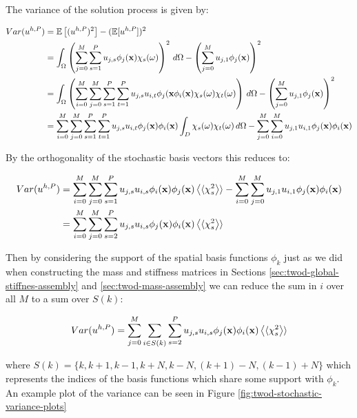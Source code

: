 The variance of the solution process is given by:

\begin{align}
  \begin{split}
      Var(u^{h,P}) &= \mathbb{E}\left[(u^{h,P})^2\right] - (\mathbb{E}[u^{h,P}])^2 \\
        &= \int_\Omega\left(
              \sum_{j=0}^M\sum_{s=1}^Pu_{j,s}\phi_j(\mathbf{x})\chi_s(\omega)
          \right)^2\, d\Omega - \left(\sum_{j=0}^Mu_{j,1}\phi_j(\mathbf{x})\right)^2 \\
          &= \int_\Omega\left(\sum_{i=0}^M\sum_{j=0}^M\sum_{s=1}^P\sum_{t=1}^P
          u_{j,s}u_{i,t}\phi_j(\mathbf{x}\phi_i(\mathbf{x})\chi_s(\omega)\chi_t(\omega)
      \right)\, d\Omega - \left(\sum_{j=0}^Mu_{j,1}\phi_j(\mathbf{x})\right)^2 \\
      &= \sum_{i=0}^M\sum_{j=0}^M\sum_{s=1}^P\sum_{t=1}^Pu_{j,s}u_{i,t}
         \phi_j(\mathbf{x})\phi_i(\mathbf{x})\int_D\chi_s(\omega)\chi_t(\omega)\, d\Omega
         - \sum_{j=0}^M\sum_{i=0}^Mu_{j,1}u_{i,1}\phi_j(\mathbf{x})\phi_i(\mathbf{x})
  \end{split}
\end{align}

By the orthogonality of the stochastic basis vectors this reduces to:

\begin{align}
  \begin{split}
    Var(u^{h,P}) &= \sum_{i=0}^M\sum_{j=0}^M\sum_{s=1}^P
        u_{j,s}u_{i,s}\phi_i(\mathbf{x})\phi_j(\mathbf{x})\left\langle\langle\chi_s^2\right\rangle\rangle -
        \sum_{i=0}^M\sum_{j=0}^Mu_{j,1}u_{i,1}\phi_j(\mathbf{x})\phi_i(\mathbf{x}) \\
      &= \sum_{i=0}^M\sum_{j=0}^M\sum_{s=2}^P
        u_{j,s}u_{i,s}\phi_j(\mathbf{x})\phi_i(\mathbf{x})\left\langle\langle\chi_s^2\right\rangle\rangle
  \end{split}
\end{align}

Then by considering the support of the spatial basis functions $\phi_k$ just as
we did when constructing the mass and stiffness matrices in Sections
\ref{sec:twod-global-stiffnes-assembly} and \ref{sec:twod-mass-assembly} we can
reduce the sum in $i$ over all $M$ to a sum over $S(k)$:

\begin{equation}
    Var(u^{h,P}) = \sum_{j=0}^M\sum_{i \in S(k)}\sum_{s=2}^Pu_{j,s}u_{i,s}
        \phi_j(\mathbf{x})\phi_i(\mathbf{x})\left\langle\langle\chi_s^2\right\rangle\rangle
\end{equation}

where $S(k) = \{k, k+1, k-1, k+N, k-N, (k+1)-N, (k-1)+N\}$ which represents the
indices of the basis functions which share some support with $\phi_k$. An
example plot of the variance can be seen in Figure
\ref{fig:twod-stochastic-variance-plots}

